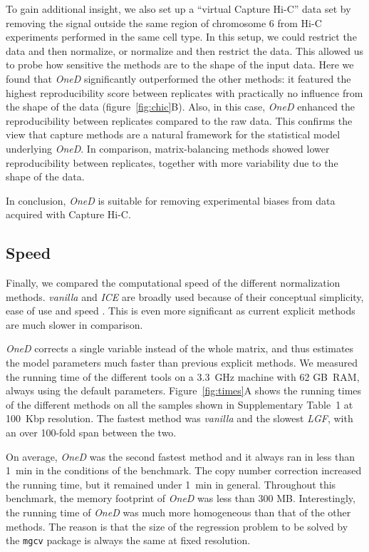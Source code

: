 \documentclass[a4,center,fleqn]{NAR}
\begin{document}
To gain additional insight, we also set up a ``virtual Capture Hi-C'' data
set by removing the signal outside the same region of chromosome 6 from
Hi-C experiments performed in the same cell type. In this setup, we could
restrict the data and then normalize, or normalize and then restrict the
data. This allowed us to probe how sensitive the methods are to the shape
of the input data. Here we found that \textit{OneD} significantly
outperformed the other methods: it featured the highest reproducibility
score between replicates with practically no influence from the shape of
the data (figure~\ref{fig:chic}B). Also, in this case, \textit{OneD}
enhanced the reproducibility between replicates compared to the raw data.
This confirms the view that capture methods are a natural framework for
the statistical model underlying \textit{OneD}. In comparison,
matrix-balancing methods showed lower reproducibility between replicates,
together with more variability due to the shape of the data.

In conclusion, \textit{OneD} is suitable for removing experimental biases
from data acquired with Capture Hi-C.

\subsection{Speed}

Finally, we compared the computational speed of the different
normalization methods. \textit{vanilla} and \textit{ICE} are broadly used
because of their conceptual simplicity, ease of use and speed
\citep{imakaev2012iterative}. This is even more significant as current
explicit methods \citep{servant2012hitc} are much slower in comparison.

\textit{OneD} corrects a single variable instead of the whole matrix, and
thus estimates the model parameters much faster than previous explicit
methods. We measured the running time of the different tools on a 3.3~GHz
machine with 62 GB~RAM, always using the default parameters.
Figure~\ref{fig:times}A shows the running times of the different methods
on all the samples shown in Supplementary Table~1 at 100~Kbp resolution.
The fastest method was \textit{vanilla} and the slowest \textit{LGF}, with
an over 100-fold span between the two.

On average, \textit{OneD} was the second fastest method and it always ran in less than
1~min in the conditions of the benchmark. The copy number correction
increased the running time, but it remained under 1~min in general.
Throughout this benchmark, the memory footprint of \textit{OneD} was less
than 300 MB.  Interestingly, the running time of \textit{OneD} was much
more homogeneous than that of the other methods. The reason is that the
size of the regression problem to be solved by the \texttt{mgcv} package
is always the same at fixed resolution.
\end{document}
